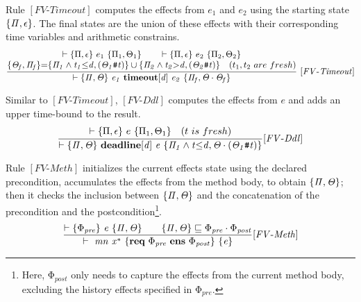 \documentclass[acmsmall,10pt,review]{acmart}
\newcommand{\effect}{{\ensuremath{\mathrm{\Phi}}}}
\newcommand{\code}[1]{{\tt{\ensuremath{\m{#1}}}}}
\newcommand{\CONTAIN}{\sqsubseteq}
\newcommand{\m}{\mathit}
\newcommand{\mysharp}{{\mathrel{\texttt{\#}}}}
\begin{document}
{\vspace{1mm}
Rule \code{[FV\text{-}Timeout]} computes the effects from \code{e_1} and \code{e_2}
using the starting state \code{\s{\Pi, \epsilon}}. The final states are the union 
of these effects with their corresponding time variables and arithmetic constrains. 
{{\small\begin{gather*}
  \code{\frac{
    \begin{matrix}
      \vdash \{\Pi, \epsilon \}\ e_1 \ \{  \Pi_1, \Theta_1\} 
      \qquad 
      \vdash \{ \Pi, \epsilon \}\ e_2 \ \{  \Pi_2, \Theta_2 \} 
      \\
      \s{\Theta_f, \Pi_f} {=} \s{\Pi_1  \wedge t_1{\leq}d, (\Theta_1\mysharp t)}
      \cup 
  \s{\Pi_2  \wedge t_2{>}d,  (\Theta_2\mysharp t)}   
  \quad (t_1, t_2\ are\ fresh)     
\end{matrix}
  }
  {\vdash \s{ \Pi, \Theta} \  
  e_1\ \textbf{timeout} [d] \  e_2
   \ \s{\Pi_f, \Theta \cdot \Theta_f} } \   {[FV\text{-}Timeout]}} 
\end{gather*}}}


\vspace{1mm}
Similar to \code{[FV\text{-}Timeout]}, \code{[FV\text{-}Ddl]} computes the effects 
from \code{e} and adds an upper time-bound to the result. 
{{\small\begin{gather*}
  \code{\frac{
    \begin{matrix}
      \vdash \{ \Pi, \epsilon\}\ e \ \{  \Pi_1, \Theta_1\} 
  \quad (t\ is\ fresh)     
\end{matrix}
  }
  {\vdash \s{ \Pi, \Theta} \  
  \textbf{deadline}  [d] \ e 
   \ \s{\Pi_1  \wedge t{\leq}d, \Theta  \cdot (\Theta_1\mysharp t)} }   
    {[FV\text{-}Ddl]}} 
  \end{gather*}}}

  \vspace{1mm}
  Rule \code{[FV\text{-}Meth]} initializes the current effects state 
using the declared precondition, accumulates the effects from the method body, 
to obtain \code{ \s{\Pi, \Theta}}; then  it
checks the  inclusion between \code{ \s{\Pi, \Theta}} and the concatenation of 
the precondition and the postcondition\footnote{Here, 
\code{\effect_{post}} only needs to capture the effects from the current method body, excluding the history effects specified in \code{\effect_{pre}}. }.
  {{\small\begin{gather*}
\code{\frac{  \vdash \s{\effect_{pre}}
 \ e \  \{ \Pi, \Theta \} \qquad   \{ \Pi, \Theta \} \CONTAIN  
 \effect_{pre} \cdot \effect_{post}}{  \vdash  \ mn  \ {x^*}\ \{\textbf{req}\ \effect_{pre}\ 
  \textbf{ens}\  \effect_{post}\} \ \{ e \}}   {[FV\text{-}Meth]}}  
  \end{gather*}}}


}
\end{document}
